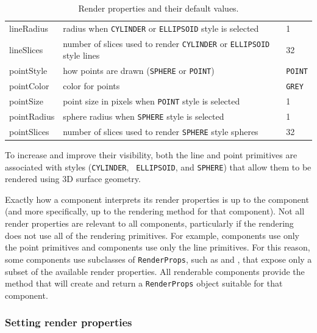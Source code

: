 \begin{table}
\begin{center}
\begin{tabular}{|lll|}
lineRadius & radius when {\tt CYLINDER} or {\tt ELLIPSOID} style is selected &
1 \\
lineSlices &
number of slices used to render {\tt CYLINDER} or {\tt ELLIPSOID} style lines &
32 \\
\hline
pointStyle & how points are drawn ({\tt SPHERE} or {\tt POINT}) & {\tt POINT} \\
pointColor & color for points & {\tt GREY} \\
pointSize & point size in pixels when {\tt POINT} style is selected & 1 \\
pointRadius & sphere radius when {\tt SPHERE} style is selected & 1 \\
pointSlices & number of slices used to render {\tt SPHERE} style spheres & 32 \\
\hline
\end{tabular}
\end{center}
\caption{Render properties and their default values.}
\label{RenderProps:tab}
\end{table}

To increase and improve their visibility, both the line and point
primitives are associated with styles ({\tt CYLINDER}, {\tt
ELLIPSOID}, and {\tt SPHERE}) that allow them to be rendered using 3D
surface geometry.

Exactly how a component interprets its render properties is up to the
component (and more specifically, up to the rendering method for that
component).  Not all render properties are relevant to all components,
particularly if the rendering does not use all of the rendering
primitives. For example,
 components use only
the point primitives and
 components use only
the line primitives. For this reason, some components use subclasses
of {\tt RenderProps}, such as
 and
, that expose only a subset
of the available render properties. All renderable components provide
the method
 that
will create and return a {\tt RenderProps} object suitable for that
component.

\subsubsection{Setting render properties}
\label{SettingRenderProperties:sec}

